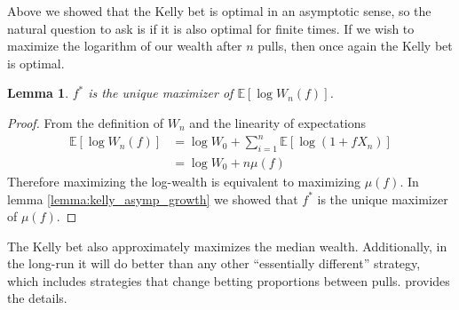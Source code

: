 \documentclass[letterpaper]{article}
\numberwithin{equation}{section}
\theoremstyle{plain}
\newtheorem{lemma}{Lemma}[section]
\begin{document}
Above we showed that the Kelly bet is optimal in an asymptotic sense, so the natural question to ask is if it is also optimal for finite times. If we wish to maximize the logarithm of our wealth after $n$ pulls, then once again the Kelly bet is optimal.
\begin{lemma}
$f^*$ is the unique maximizer of $\mathbb{E}[\log W_n(f)]$.
\end{lemma}
\begin{proof}
From the definition of $W_n$ and the linearity of expectations
\begin{align}
\mathbb{E}[\log W_n(f)] &= \log W_0 + \sum_{i=1}^n \mathbb{E}[\log (1+f X_n)]\\
&= \log W_0 + n \mu(f)
\end{align}
Therefore maximizing the log-wealth is equivalent to maximizing $\mu(f)$. In lemma \ref{lemma:kelly_asymp_growth} we showed that $f^*$ is the unique maximizer of $\mu(f)$.
\end{proof}

The Kelly bet also approximately maximizes the median wealth. Additionally, in the long-run it will do better than any other ``essentially different'' strategy, which includes strategies that change betting proportions between pulls. \cite{ethier2010doctrine} provides the details.
\end{document}
